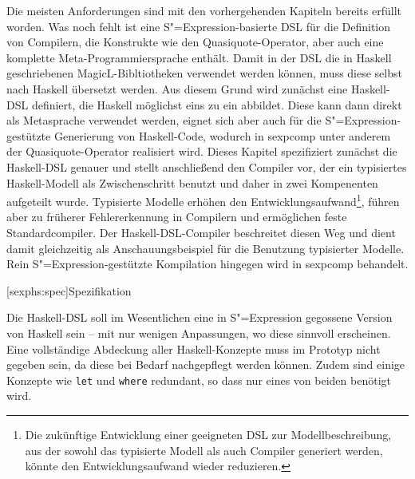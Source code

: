 \documentclass[12pt, a4paper, bibgerm]{scrbook}
\newcommand\icode[1]{\lstinline?#1?}
\newcommand\lsection{}
\newcommand\cref{}
\newcommand{\sexp}{S"=Expression}
\begin{document}
Die meisten Anforderungen sind mit den vorhergehenden Kapiteln bereits
erfüllt worden. Was noch fehlt ist eine \sexp{}-basierte DSL für die
Definition von Compilern, die Konstrukte wie den Quasiquote-Operator,
aber auch eine komplette Meta-Programmiersprache enthält. Damit in der
DSL die in Haskell geschriebenen MagicL-Bibltiotheken verwendet werden
können, muss diese selbst nach Haskell übersetzt werden. Aus diesem
Grund wird zunächst eine Haskell-DSL definiert, die Haskell möglichst
eins zu ein abbildet. Diese kann dann direkt als Metasprache verwendet
werden, eignet sich aber auch für die \sexp{}-gestützte Generierung von
Haskell-Code, wodurch in \cref{sexpcomp} unter anderem der
Quasiquote-Operator realisiert wird. Dieses Kapitel spezifiziert
zunächst die Haskell-DSL genauer und stellt anschließend den Compiler
vor, der ein typisiertes Haskell-Modell als Zwischenschritt benutzt und
daher in zwei Kompenenten aufgeteilt wurde. Typisierte Modelle erhöhen
den Entwicklungsaufwand\footnote{Die zukünftige Entwicklung einer
  geeigneten DSL zur Modellbeschreibung, aus der sowohl das typisierte
  Modell als auch Compiler generiert werden, könnte den
  Entwicklungsaufwand wieder reduzieren.}, führen aber zu früherer
Fehlererkennung in Compilern und ermöglichen feste Standardcompiler. Der
Haskell-DSL-Compiler beschreitet diesen Weg und dient damit gleichzeitig
als Anschauungsbeispiel für die Benutzung typisierter Modelle. Rein
\sexp{}-gestützte Kompilation hingegen wird in \cref{sexpcomp}
behandelt.

\lsection[sexphs:spec]{Spezifikation}

Die Haskell-DSL soll im Wesentlichen eine in \sexp{} gegossene Version
von Haskell sein -- mit nur wenigen Anpassungen, wo diese sinnvoll
erscheinen. Eine vollständige Abdeckung aller Haskell-Konzepte muss im
Prototyp nicht gegeben sein, da diese bei Bedarf nachgepflegt werden
können. Zudem sind einige Konzepte wie \icode{let} und \icode{where}
redundant, so dass nur eines von beiden benötigt wird. 
\end{document}
